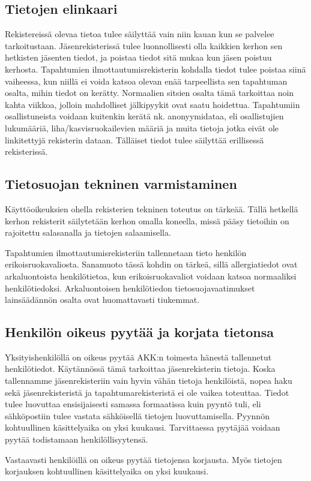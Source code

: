 \documentclass[finnish]{tktltiki}
\begin{document}
\subsection*{Tietojen elinkaari}
Rekistereissä olevaa tietoa tulee säilyttää vain niin kauan kun se palvelee tarkoitustaan. Jäsenrekisterissä tulee luonnollisesti olla kaikkien kerhon sen hetkisten jäsenten tiedot, ja poistaa tiedot sitä mukaa kun jäsen poistuu kerhosta. 
Tapahtumien ilmottautumisrekisterin kohdalla tiedot tulee poistaa siinä vaiheessa, kun niillä ei voida katsoa olevan enää tarpeellista sen tapahtuman osalta, mihin tiedot on kerätty. Normaalien sitsien osalta tämä tarkoittaa noin kahta viikkoa, jolloin mahdolliset jälkipyykit ovat saatu hoidettua. 
Tapahtumiin osallistuneista voidaan kuitenkin kerätä nk. anonyymidataa, eli osallistujien lukumääriä, liha/kasvisruokailevien määriä ja muita tietoja jotka eivät ole linkitettyjä rekisterin dataan. Tälläiset tiedot tulee säilyttää erillisessä rekisterissä.

\subsection*{Tietosuojan tekninen varmistaminen}
Käyttöoikeuksien ohella rekisterien tekninen toteutus on tärkeää. Tällä hetkellä kerhon rekisterit säilytetään kerhon omalla koneella, missä pääsy tietoihin on rajoitettu salasanalla ja tietojen salaamisella.

Tapahtumien ilmottautumisrekisteriin tallennetaan tieto henkilön erikoisruokavaliosta. Sanamuoto tässä kohdin on tärkeä, sillä allergiatiedot ovat arkaluontoista henkilötietoa, kun erikoisruokavaliot voidaan katsoa normaaliksi henkilötiedoksi. Arkaluontoisen henkilötiedon tietosuojavaatimukset lainsäädännön osalta ovat huomattavasti tiukemmat. 

\subsection*{Henkilön oikeus pyytää ja korjata tietonsa}
Yksityishenkilöllä on oikeus pyytää AKK:n toimesta hänestä tallennetut henkilötiedot. Käytännössä tämä tarkoittaa jäsenrekisterin tietoja.
Koska tallennamme jäsenrekisteriin vain hyvin vähän tietoja henkilöistä, nopea haku sekä jäsenrekisteristä ja tapahtumarekisteristä ei ole vaikea toteuttaa. Tiedot tulee luovuttaa ensisijaisesti samassa formaatissa kuin pyyntö tuli, eli sähköpostiin tulee vastata sähköisellä tietojen luovuttamisella. Pyynnön kohtuullinen käsittelyaika on yksi kuukausi.
Tarvittaessa pyytäjää voidaan pyytää todistamaan henkilöllisyytensä.

Vastaavasti henkilöillä on oikeus pyytää tietojensa korjausta. Myös tietojen korjauksen kohtuullinen käsittelyaika on yksi kuukausi. 
\end{document}
